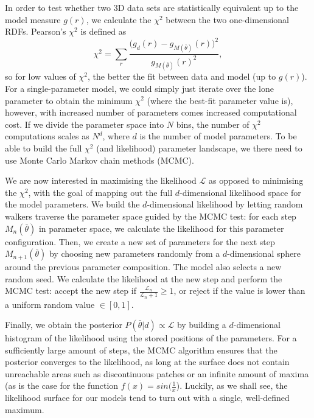 \documentclass[aps,pre,twocolumn,letterpaper,floatfix,showpacs]{revtex4}
\begin{document}
In order to test whether two 3D data sets are statistically equivalent up to the model measure $g(r)$, we calculate the $\chi^2$ between the two one-dimensional RDFs. Pearson's $\chi^2$ is defined as 
\begin{equation}
  \chi^2 = \sum_r \frac{ \Big(g_d(r) - g_{M(\bar \theta)}(r) \Big)^2}{g_{M(\bar \theta)}(r)^2},
\end{equation}
so for low values of $\chi^2$, the better the fit between data and model (up to $g(r)$). For a single-parameter model, we could simply just iterate over the lone parameter to obtain the minimum $\chi^2$ (where the best-fit parameter value is), however, with increased number of parameters comes increased computational cost. If we divide the parameter space into $N$ bins, the number of $\chi^2$ computations scales as $N^d$, where $d$ is the number of model parameters. To be able to build the full $\chi^2$ (and likelihood) parameter landscape, we there need to use Monte Carlo Markov chain methods (MCMC).

We are now interested in maximising the likelihood $\mathcal L$ as opposed to minimising the $\chi^2$, with the goal of mapping out the full $d$-dimensional likelihood space for the model parameters. We build the $d$-dimensional likelihood by letting random walkers traverse the parameter space guided by the MCMC test: for each step $M_n(\bar \theta)$ in parameter space, we calculate the likelihood for this parameter configuration. Then, we create a new set of parameters for the next step $M_{n+1}(\bar \theta)$ by choosing new parameters randomly from a $d$-dimensional sphere around the previous parameter composition. The model also selects a new random seed. We calculate the likelihood at the new step and perform the MCMC test: accept the new step if $\frac{\mathcal L_n}{\mathcal L_n+1} \ge 1$, or reject if the value is lower than a uniform random value $\in [0,1]$. 

Finally, we obtain the posterior $P(\bar \theta | d) \propto \mathcal L$ by building a $d$-dimensional histogram of the likelihood using the stored positions of the parameters. For a sufficiently large amount of steps, the MCMC algorithm ensures that the posterior converges to the likelihood, as long at the surface does not contain unreachable areas such as discontinuous patches or an infinite amount of maxima (as is the case for the function $f(x)=sin(\frac{1}{x}$). Luckily, as we shall see, the likelihood surface for our models tend to turn out with a single, well-defined maximum.  
\end{document}
